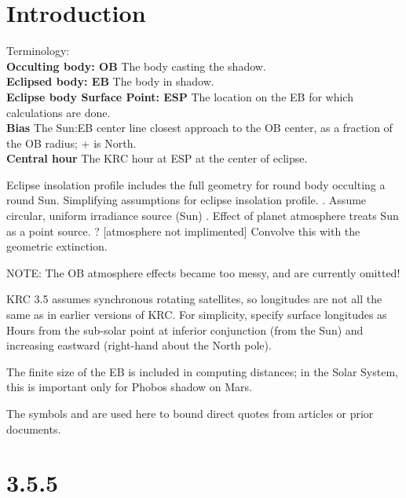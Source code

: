 \documentclass{article}
\begin{document}

\section{Introduction}

Terminology: 
\\ \textbf{Occulting body: OB} The body casting the shadow.  %
\\ \textbf{Eclipsed body: EB} The body in shadow.  %
\\ \textbf{Eclipse body Surface Point: ESP} The location on the EB for which calculations are done. 
\\ \textbf{Bias} The Sun:EB center line closest approach to the OB center, as a fraction of the OB radius; + is North.
\\ \textbf{Central hour} The KRC hour at ESP at the center of eclipse.

Eclipse insolation profile includes the full geometry for round body occulting a round Sun. Simplifying assumptions for eclipse insolation profile.
. Assume circular, uniform irradiance source (Sun)
. Effect of planet atmosphere treats Sun as a point source. ? [atmosphere not implimented]
\qii  Convolve this with the geometric extinction.

NOTE: The OB atmosphere effects became too messy, and are currently omitted!

KRC 3.5 assumes synchronous rotating satellites, so longitudes are not all the
same as in earlier versions of KRC. For simplicity, specify surface longitudes
as Hours from the sub-solar point at inferior conjunction (from the Sun) and
increasing eastward (right-hand about the North pole).

The finite size of the EB is included in computing distances; in the Solar
System, this is important only for Phobos shadow on Mars.

The symbols \bq and \eq are used here to bound direct quotes from articles or
prior documents.

\section{3.5.5}
\end{document}
